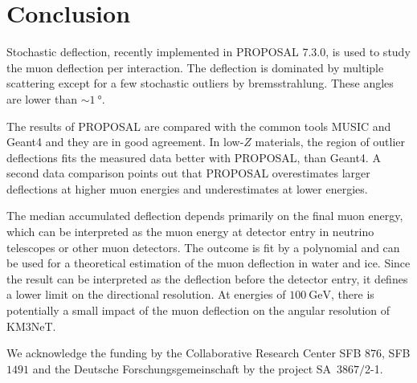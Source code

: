 \section{Conclusion}\label{sec:conclusion}

Stochastic deflection, recently implemented in PROPOSAL 7.3.0, is 
used to study the muon deflection per interaction. The deflection 
is dominated by multiple scattering except for a few stochastic 
outliers by bremsstrahlung. These angles are lower than
$\sim\SI{1}{\degree}$. 

The results of PROPOSAL are compared with the common tools MUSIC and 
Geant4 and they are in good agreement. In low-$Z$ materials, the region of outlier 
deflections fits the measured data better with PROPOSAL, than Geant4. 
A second data comparison points out that PROPOSAL overestimates 
larger deflections at higher muon energies and underestimates at lower 
energies.

The median accumulated deflection depends primarily on the final muon energy, which can be interpreted as the muon energy at detector entry 
in neutrino telescopes or other muon detectors.
The outcome is fit by a polynomial and can be used for 
a theoretical estimation of the muon deflection in water and ice.
Since the result can be interpreted as the deflection before the detector entry, it defines a lower limit on the directional resolution.
At energies of $\SI{100}{\giga\electronvolt}$, there is potentially a small impact of the muon deflection on the angular 
resolution of KM3NeT.


\begin{acknowledgement}
  We acknowledge the funding by the Collaborative Research Center SFB $876$, SFB $1491$ 
  and the Deutsche Forschungsgemeinschaft by the project SA~$3867/$2-1.
\end{acknowledgement}


\printbibliography




